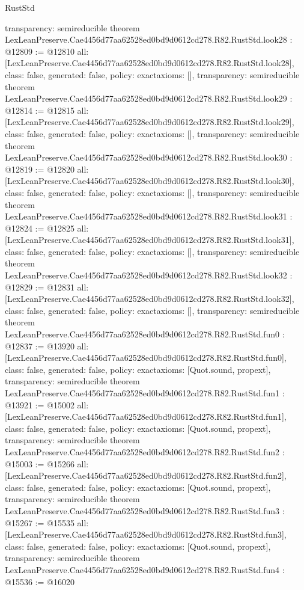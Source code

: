 \begin{lexlean}{RustStd}
\begin{coremodule}
{  transparency: semireducible
}
theorem LexLeanPreserve.Cae4456d77aa62528ed0bd9d0612cd278.R82.RustStd.look28 : @12809 := @12810 {
  all: [LexLeanPreserve.Cae4456d77aa62528ed0bd9d0612cd278.R82.RustStd.look28],
  class: false,
  generated: false,
  policy: exact{axioms: []},
  transparency: semireducible
}
theorem LexLeanPreserve.Cae4456d77aa62528ed0bd9d0612cd278.R82.RustStd.look29 : @12814 := @12815 {
  all: [LexLeanPreserve.Cae4456d77aa62528ed0bd9d0612cd278.R82.RustStd.look29],
  class: false,
  generated: false,
  policy: exact{axioms: []},
  transparency: semireducible
}
theorem LexLeanPreserve.Cae4456d77aa62528ed0bd9d0612cd278.R82.RustStd.look30 : @12819 := @12820 {
  all: [LexLeanPreserve.Cae4456d77aa62528ed0bd9d0612cd278.R82.RustStd.look30],
  class: false,
  generated: false,
  policy: exact{axioms: []},
  transparency: semireducible
}
theorem LexLeanPreserve.Cae4456d77aa62528ed0bd9d0612cd278.R82.RustStd.look31 : @12824 := @12825 {
  all: [LexLeanPreserve.Cae4456d77aa62528ed0bd9d0612cd278.R82.RustStd.look31],
  class: false,
  generated: false,
  policy: exact{axioms: []},
  transparency: semireducible
}
theorem LexLeanPreserve.Cae4456d77aa62528ed0bd9d0612cd278.R82.RustStd.look32 : @12829 := @12831 {
  all: [LexLeanPreserve.Cae4456d77aa62528ed0bd9d0612cd278.R82.RustStd.look32],
  class: false,
  generated: false,
  policy: exact{axioms: []},
  transparency: semireducible
}
theorem LexLeanPreserve.Cae4456d77aa62528ed0bd9d0612cd278.R82.RustStd.fun0 : @12837 := @13920 {
  all: [LexLeanPreserve.Cae4456d77aa62528ed0bd9d0612cd278.R82.RustStd.fun0],
  class: false,
  generated: false,
  policy: exact{axioms: [Quot.sound, propext]},
  transparency: semireducible
}
theorem LexLeanPreserve.Cae4456d77aa62528ed0bd9d0612cd278.R82.RustStd.fun1 : @13921 := @15002 {
  all: [LexLeanPreserve.Cae4456d77aa62528ed0bd9d0612cd278.R82.RustStd.fun1],
  class: false,
  generated: false,
  policy: exact{axioms: [Quot.sound, propext]},
  transparency: semireducible
}
theorem LexLeanPreserve.Cae4456d77aa62528ed0bd9d0612cd278.R82.RustStd.fun2 : @15003 := @15266 {
  all: [LexLeanPreserve.Cae4456d77aa62528ed0bd9d0612cd278.R82.RustStd.fun2],
  class: false,
  generated: false,
  policy: exact{axioms: [Quot.sound, propext]},
  transparency: semireducible
}
theorem LexLeanPreserve.Cae4456d77aa62528ed0bd9d0612cd278.R82.RustStd.fun3 : @15267 := @15535 {
  all: [LexLeanPreserve.Cae4456d77aa62528ed0bd9d0612cd278.R82.RustStd.fun3],
  class: false,
  generated: false,
  policy: exact{axioms: [Quot.sound, propext]},
  transparency: semireducible
}
theorem LexLeanPreserve.Cae4456d77aa62528ed0bd9d0612cd278.R82.RustStd.fun4 : @15536 := @16020 {
}
\end{coremodule}
\end{lexlean}
